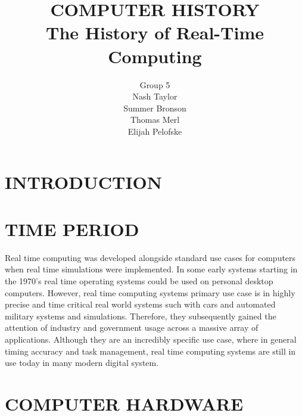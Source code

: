 \documentclass[letterpaper, 10 pt, conference]{IEEEconf}
\title{\LARGE \bf
COMPUTER HISTORY\\
\large The History of Real-Time Computing
}
\author{Group 5\\
\small Nash Taylor\\
\small Summer Bronson\\
\small Thomas Merl\\
\small Elijah Pelofske
}
\begin{document}
\maketitle
\thispagestyle{empty}
\pagestyle{empty}


\section{INTRODUCTION}

\section{TIME PERIOD}
Real time computing was developed alongside standard use cases for computers when real time simulations were implemented. In some early systems starting in the 1970's real time operating systems could be used on personal desktop computers. However, real time computing systems primary use case is in highly precise and time critical real world systems such with cars and automated military systems and simulations. Therefore, they subsequently gained the attention of industry and government usage across a massive array of applications. Although they are an incredibly specific use case, where in general timing accuracy and task management, real time computing systems are still in use today in many modern digital system.

\section{COMPUTER HARDWARE}
\end{document}
